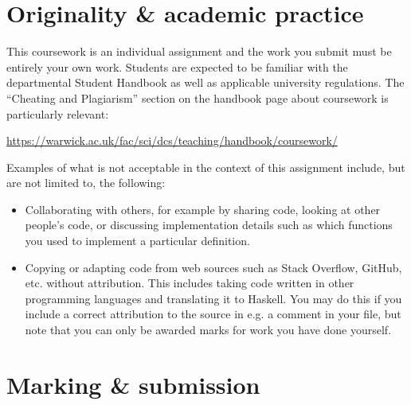 
\section{Originality \& academic practice}

This coursework is an individual assignment and the work you submit must be entirely your own work. Students are expected to be familiar with the departmental Student Handbook as well as applicable university regulations. The ``Cheating and Plagiarism'' section on the handbook page about coursework is particularly relevant:
\begin{center}\small
	\url{https://warwick.ac.uk/fac/sci/dcs/teaching/handbook/coursework/}
\end{center}
Examples of what is not acceptable in the context of this assignment include, but are not limited to, the following:
\begin{itemize}
	\item Collaborating with others, for example by sharing code, looking at other people's code, or discussing implementation details such as which functions you used to implement a particular definition. 
	
	\item Copying or adapting code from web sources such as Stack Overflow, GitHub, etc. without attribution. This includes taking code written in other programming languages and translating it to Haskell. You may do this if you include a correct attribution to the source in e.g. a comment in your file, but note that you can only be awarded marks for work you have done yourself. 
\end{itemize}


\section{Marking \& submission}

